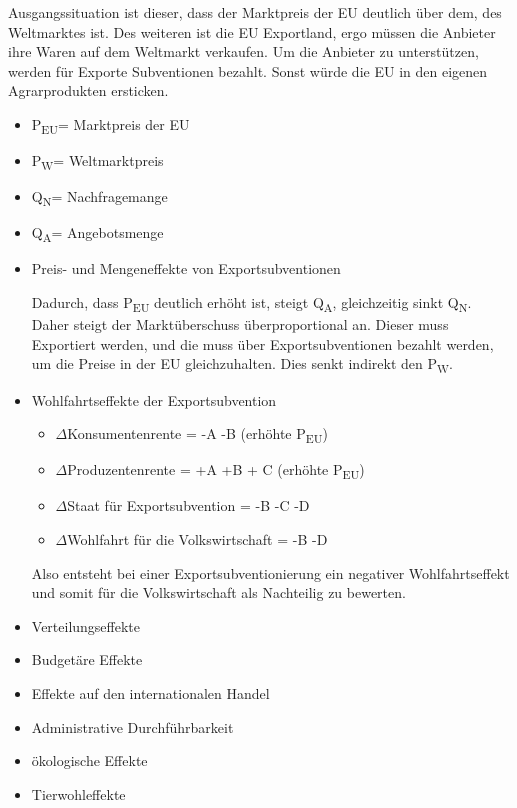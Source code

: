 \documentclass[11pt]{scrartcl}
\begin{document}
Ausgangssituation ist dieser, dass der Marktpreis der \ac{EU} deutlich über dem, des Weltmarktes ist.
Des weiteren ist die \ac{EU} Exportland, ergo müssen die Anbieter ihre Waren auf dem Weltmarkt verkaufen.
Um die Anbieter zu unterstützen, werden für Exporte Subventionen bezahlt.
Sonst würde die \ac{EU} in den eigenen Agrarprodukten ersticken.


\begin{itemize}
	\item P\textsubscript{EU}= Marktpreis der \ac{EU}
	\item P\textsubscript{W}= Weltmarktpreis
	\item Q\textsubscript{N}= Nachfragemange
	\item Q\textsubscript{A}= Angebotsmenge
\end{itemize}


\begin{itemize}
	\item Preis- und Mengeneffekte von Exportsubventionen

		Dadurch, dass P\textsubscript{EU} deutlich erhöht ist, steigt Q\textsubscript{A}, gleichzeitig sinkt Q\textsubscript{N}.
		Daher steigt der Marktüberschuss überproportional an.
		Dieser muss Exportiert werden, und die muss über Exportsubventionen bezahlt werden, um die Preise in der \ac{EU} gleichzuhalten.
		Dies senkt indirekt den P\textsubscript{W}.

	\item Wohlfahrtseffekte der Exportsubvention
	
\begin{itemize}
	\item $\Delta$Konsumentenrente = -A -B (erhöhte P\textsubscript{EU})
	\item $\Delta$Produzentenrente = +A +B + C (erhöhte P\textsubscript{EU})
	\item $\Delta$Staat für Exportsubvention = -B -C -D
	\item $\Delta$Wohlfahrt für die Volkswirtschaft = -B -D
		

\end{itemize}
		Also entsteht bei einer Exportsubventionierung ein negativer Wohlfahrtseffekt und somit für die Volkswirtschaft als Nachteilig zu bewerten.

	\item Verteilungseffekte
	\item Budgetäre Effekte
	\item Effekte auf den internationalen Handel
	\item Administrative Durchführbarkeit
	\item ökologische Effekte
	\item Tierwohleffekte
\end{itemize}
\end{document}
